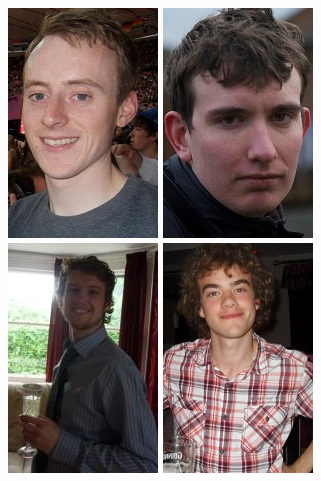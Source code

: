 \begin{figure}[h]
\begin{center}
\includegraphics[scale=0.5]{./pm/bernard}
\includegraphics[scale=0.5]{./pm/greg}
\includegraphics[scale=0.5]{./pm/nathan}
\includegraphics[scale=0.5]{./pm/robin}

\end{center}
\end{figure}
